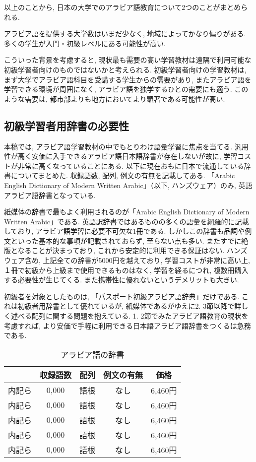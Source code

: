 \documentclass[technicalreport]{ieicej}
\begin{document}
以上のことから, 日本の大学でのアラビア語教育について2つのことがまとめられる. 

アラビア語を提供する大学数はいまだ少なく, 地域によってかなり偏りがある. 
多くの学生が入門・初級レベルにある可能性が高い. 

こういった背景を考慮すると, 現状最も需要の高い学習教材は遠隔で利用可能な初級学習者向けのものではないかと考えられる. 初級学習者向けの学習教材は, まず大学でアラビア語科目を受講する学生からの需要があり, またアラビア語を学習できる環境が周囲になく, アラビア語を独学するひとの需要にも適う. このような需要は, 都市部よりも地方においてより顕著である可能性が高い.

\subsection{初級学習者用辞書の必要性}
本稿では, アラビア語学習教材の中でもとりわけ語彙学習に焦点を当てる. 汎用性が高く安価に入手できるアラビア語日本語辞書が存在しないが故に, 学習コストが非常に高くなっていることにある. 以下に現在おもに日本で流通している辞書についてまとめた. 収録語数, 配列, 例文の有無を記載してある. 「Arabic English Dictionary of Modern Written Arabic」（以下, ハンズウェア）のみ, 英語アラビア語辞書となっている.

紙媒体の辞書で最もよく利用されるのが「Arabic English Dictionary of Modern Written Arabic」である. 英語訳辞書ではあるものの多くの語彙を網羅的に記載しており, アラビア語学習に必要不可欠な1冊である. しかしこの辞書も品詞や例文といった基本的な事項が記載されておらず, 至らない点も多い. またすでに絶版となることが決まっており, これから安定的に利用できる保証はない. ハンズウェア含め, 上記全ての辞書が5000円を越えており, 学習コストが非常に高い上, １冊で初級から上級まで使用できるものはなく, 学習を経るにつれ, 複数冊購入する必要性が生じてくる. また携帯性に優れないというデメリットも大きい. 

初級者を対象としたものは, 「パスポート初級アラビア語辞典」だけである. これは初級者用辞書として優れているが, 紙媒体であるがゆえに2. 3節以降で詳しく述べる配列に関する問題を抱えている. 
1. 2節でみたアラビア語教育の現状を考慮すれば, より安価で手軽に利用できる日本語アラビア語辞書をつくるは急務である. 
\begin{table}[tb]
\caption{アラビア語の辞書}
\label{table:1}
\begin{center}
 \begin{tabular}{c|c|c|c|c}
   & 収録語数 & 配列 & 例文の有無 & 価格 \\
 \hline
  内記ら &0,000& 語根 & なし & 6,460円\\
  内記ら &0,000&語根 & なし & 6,460円\\
  内記ら &0,000& 語根 & なし & 6,460円\\
  内記ら &0,000& 語根 & なし & 6,460円\\
  内記ら &0,000& 語根 & なし & 6,460円\\
   \hline
 \end{tabular}
\end{center}
\end{table}
\end{document}
